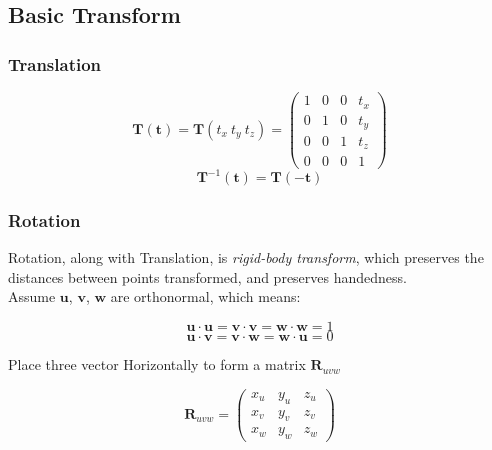 \documentclass[10pt, a4paper]{article}
\begin{document}
        \subsection{Basic Transform} 
            
            \subsubsection{Translation}
            \begin{equation*}
                \textbf{T}(\textbf{t}) = \textbf{T}(t_x\ t_y\ t_z) = \begin{pmatrix}
                    1&0&0&t_x\\
                    0&1&0&t_y\\
                    0&0&1&t_z\\
                    0&0&0&1
                \end{pmatrix}
            \end{equation*}
            $$\textbf{T}^{-1}(\textbf{t}) = \textbf{T}(-\textbf{t})$$
            
            \subsubsection{Rotation}
                Rotation, along with Translation, is \emph{rigid-body transform}, which preserves the distances between points transformed, and preserves handedness.\\
                \indent Assume $\textbf{u}$, $\textbf{v}$, $\textbf{w}$ are orthonormal, which means:
                
                \begin{equation*}
                    \textbf{u} \cdot \textbf{u} = \textbf{v} \cdot \textbf{v} = \textbf{w} \cdot \textbf{w} = 1
                \end{equation*}
                    \begin{equation*}
                    \textbf{u} \cdot \textbf{v} = \textbf{v} \cdot \textbf{w} = \textbf{w} \cdot \textbf{u} = 0
                \end{equation*}

                \indent Place three vector Horizontally to form a matrix $\textbf{R}_{uvw}$
                
                \begin{equation*}
                    \textbf{R}_{uvw} = \begin{pmatrix}
                        x_u&y_u&z_u\\
                        x_v&y_v&z_v\\
                        x_w&y_w&z_w
                    \end{pmatrix}
                \end{equation*}
\end{document}
